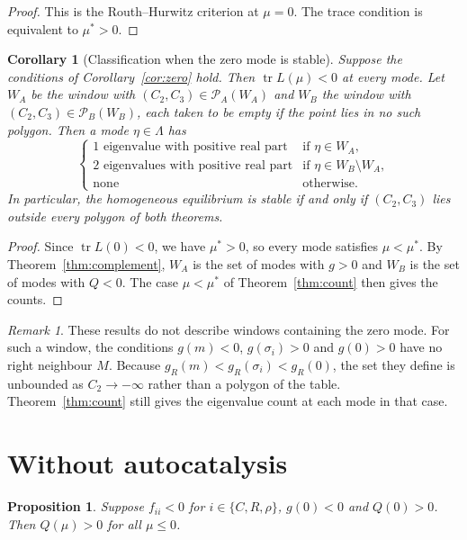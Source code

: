\documentclass[11pt]{article}
\newtheorem{proposition}{Proposition}
\newtheorem{corollary}{Corollary}
\theoremstyle{remark}
\newtheorem{remark}{Remark}
\begin{document}
\begin{proof}
This is the Routh--Hurwitz criterion at $\mu=0$. The trace condition is equivalent to $\mu^*>0$.
\end{proof}

\begin{corollary}[Classification when the zero mode is stable]\label{cor:classify}
Suppose the conditions of Corollary~\ref{cor:zero} hold. Then $\operatorname{tr}L(\mu)<0$ at every mode. Let $W_A$ be the window with $(C_2,C_3)\in\mathcal{P}_A(W_A)$ and $W_B$ the window with $(C_2,C_3)\in\mathcal{P}_B(W_B)$, each taken to be empty if the point lies in no such polygon. Then a mode $\eta\in\Lambda$ has
\[
\begin{cases}
1 \text{ eigenvalue with positive real part} & \text{if }\eta\in W_A,\\
2 \text{ eigenvalues with positive real part} & \text{if }\eta\in W_B\setminus W_A,\\
\text{none} & \text{otherwise}.
\end{cases}
\]
In particular, the homogeneous equilibrium is stable if and only if $(C_2,C_3)$ lies outside every polygon of both theorems.
\end{corollary}

\begin{proof}
Since $\operatorname{tr}L(0)<0$, we have $\mu^*>0$, so every mode satisfies $\mu<\mu^*$. By Theorem~\ref{thm:complement}, $W_A$ is the set of modes with $g>0$ and $W_B$ is the set of modes with $Q<0$. The case $\mu<\mu^*$ of Theorem~\ref{thm:count} then gives the counts.
\end{proof}

\begin{remark}
These results do not describe windows containing the zero mode. For such a window, the conditions $g(m)<0$, $g(\sigma_i)>0$ and $g(0)>0$ have no right neighbour $M$. Because $g_R(m)<g_R(\sigma_i)<g_R(0)$, the set they define is unbounded as $C_2\to-\infty$ rather than a polygon of the table. Theorem~\ref{thm:count} still gives the eigenvalue count at each mode in that case.
\end{remark}

\section{Without autocatalysis}

\begin{proposition}\label{prop:noauto}
Suppose $f_{ii}<0$ for $i\in\{C,R,\rho\}$, $g(0)<0$ and $Q(0)>0$. Then $Q(\mu)>0$ for all $\mu\le0$.
\end{proposition}
\end{document}
